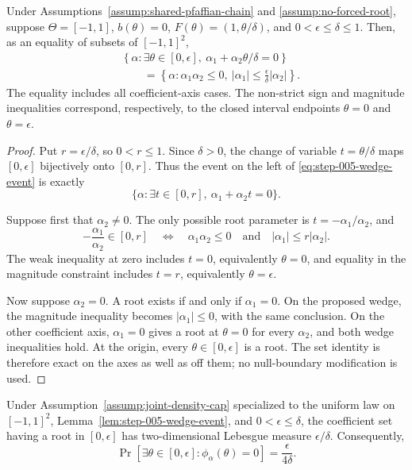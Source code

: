 \begin{lemma}
\label{lem:step-005-wedge-event}
Under Assumptions~\ref{assump:shared-pfaffian-chain} and
\ref{assump:no-forced-root}, suppose
$\Theta=[-1,1]$, $b(\theta)=0$,
$F(\theta)=(1,\theta/\delta)$, and
$0<\epsilon\leq\delta\leq1$.  Then, as an equality of subsets of
$[-1,1]^2$,
\begin{equation}
\begin{aligned}
&\left\{\alpha:\exists\theta\in[0,\epsilon],\
\alpha_1+\alpha_2\theta/\delta=0\right\}\\
&\qquad=
\left\{\alpha:\alpha_1\alpha_2\leq0,\
|\alpha_1|\leq\frac\epsilon\delta|\alpha_2|\right\}.
\end{aligned}
\label{eq:step-005-wedge-event}
\end{equation}
The equality includes all coefficient-axis cases.  The non-strict sign and
magnitude inequalities correspond, respectively, to the closed interval
endpoints $\theta=0$ and $\theta=\epsilon$.
\end{lemma}

\begin{proof}
Put $r=\epsilon/\delta$, so $0<r\leq1$.  Since $\delta>0$, the change of
variable $t=\theta/\delta$ maps $[0,\epsilon]$ bijectively onto $[0,r]$.
Thus the event on the left of \eqref{eq:step-005-wedge-event} is exactly
\[
\{\alpha:\exists t\in[0,r],\ \alpha_1+\alpha_2t=0\}.
\]

Suppose first that $\alpha_2\neq0$.  The only possible root parameter is
$t=-\alpha_1/\alpha_2$, and
\[
-\frac{\alpha_1}{\alpha_2}\in[0,r]
\quad\Longleftrightarrow\quad
\alpha_1\alpha_2\leq0
\quad\text{and}\quad
|\alpha_1|\leq r|\alpha_2|.
\]
The weak inequality at zero includes $t=0$, equivalently $\theta=0$, and
equality in the magnitude constraint includes $t=r$, equivalently
$\theta=\epsilon$.

Now suppose $\alpha_2=0$.  A root exists if and only if $\alpha_1=0$.
On the proposed wedge, the magnitude inequality becomes
$|\alpha_1|\leq0$, with the same conclusion.  On the other coefficient
axis, $\alpha_1=0$ gives a root at $\theta=0$ for every $\alpha_2$, and
both wedge inequalities hold.  At the origin, every
$\theta\in[0,\epsilon]$ is a root.  The set identity is therefore exact on
the axes as well as off them; no null-boundary modification is used.
\end{proof}

\begin{proposition}
\label{prop:step-005-wedge-probability}
Under Assumption~\ref{assump:joint-density-cap} specialized to the uniform
law on $[-1,1]^2$, Lemma~\ref{lem:step-005-wedge-event}, and
$0<\epsilon\leq\delta$, the coefficient set having a root in
$[0,\epsilon]$ has two-dimensional Lebesgue measure $\epsilon/\delta$.
Consequently,
\begin{equation}
\Pr\!\left[\exists\theta\in[0,\epsilon]:
\phi_\alpha(\theta)=0\right]
=\frac\epsilon{4\delta}.
\label{eq:step-005-wedge-probability}
\end{equation}
\end{proposition}

